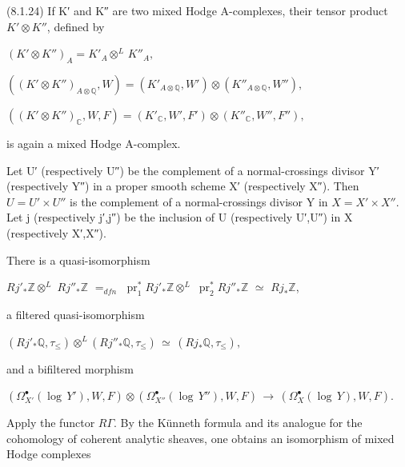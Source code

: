 \documentclass[11pt,twoside]{article}
\newcommand{\DFormula}[1]{%
  \par\smallskip\noindent\hspace*{0pt}\(\displaystyle #1\)\par\smallskip
}
\begin{document}
(8.1.24) If K′ and K″ are two mixed Hodge A-complexes, their tensor product \(K′\otimes K″\), defined by\par
\par\medskip
\DFormula{(K′\otimes K″)_{A}=K′_{A}\otimes ^{L}\,K″_{A},}
\par\medskip
\DFormula{((K′\otimes K″)_{A\otimes \mathbb{Q}},W)=(K′_{A\otimes \mathbb{Q}},W′)\otimes (K″_{A\otimes \mathbb{Q}},W″),}
\par\medskip
\DFormula{((K′\otimes K″)_{\mathbb{C}},W,F)=(K′_{\mathbb{C}},W′,F′)\otimes (K″_{\mathbb{C}},W″,F″),}
\par\medskip
is again a mixed Hodge A-complex.\par
\par\medskip
Let U′ (respectively U″) be the complement of a normal-crossings divisor Y′ (respectively Y″) in a proper smooth scheme X′ (respectively X″). Then \(U=U′\times U″\) is the complement of a normal-crossings divisor Y in \(X=X′\times X″\). Let j (respectively j′,j″) be the inclusion of U (respectively U′,U″) in X (respectively X′,X″).\par
\par\medskip
There is a quasi-isomorphism\par
\par\medskip
\(Rj′_{\ast }\mathbb{Z}\otimes ^{L}\) \(Rj″_{\ast }\mathbb{Z}\) \(=_{dfn}\) \(\operatorname{pr}_{1}^{\ast }Rj′_{\ast }\mathbb{Z}\otimes ^{L}\) \(\operatorname{pr}_{2}^{\ast }Rj″_{\ast }\mathbb{Z}\) \(\simeq \) \(Rj_{\ast }\mathbb{Z}\),\par
\par\medskip
a filtered quasi-isomorphism\par
\par\medskip
\DFormula{(Rj′_{\ast }\mathbb{Q},\tau _{\leq })\otimes ^{L}(Rj″_{\ast }\mathbb{Q},\tau _{\leq })\,\simeq \,(Rj_{\ast }\mathbb{Q},\tau _{\leq }),}
\par\medskip
and a bifiltered morphism\par
\par\medskip
\DFormula{(\Omega _{X′}^{\bullet }(\operatorname{log}\,Y′),W,F)\otimes (\Omega _{X″}^{\bullet }(\operatorname{log}\,Y″),W,F)\,\to \,(\Omega _{X}^{\bullet }(\operatorname{log}\,Y),W,F).}
\par\medskip
Apply the functor \(R\Gamma \). By the Künneth formula and its analogue for the cohomology of coherent analytic sheaves, one obtains an isomorphism of mixed Hodge complexes\par
\par\medskip
\end{document}
